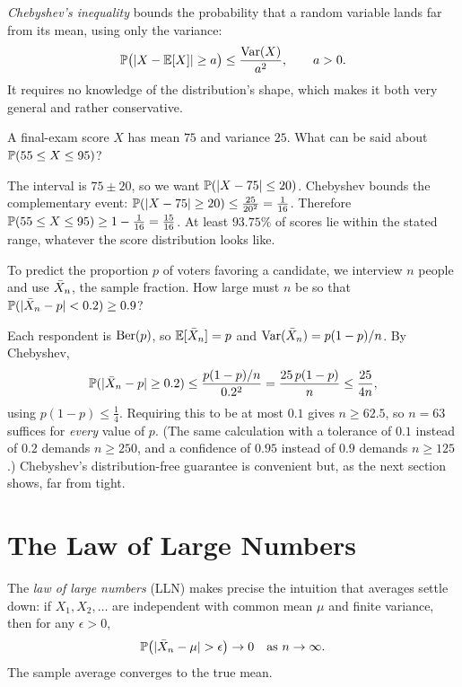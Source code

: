 \emph{Chebyshev's inequality} bounds the probability that a random variable lands
far from its mean, using only the variance:
\[
  \mathbb{P}\bigl(|X-\mathbb{E}[X]|\ge a\bigr)\le\frac{\mathrm{Var}(X)}{a^2},\qquad a>0.
\]
It requires no knowledge of the distribution's shape, which makes it both very
general and rather conservative.

\begin{example}
A final-exam score $X$ has mean $75$ and variance $25$. What can be said about
$\mathbb{P}(55\le X\le 95)$?

\solution The interval is $75\pm 20$, so we want $\mathbb{P}(|X-75|\le 20)$. Chebyshev
bounds the complementary event:
$\mathbb{P}(|X-75|\ge 20)\le \tfrac{25}{20^2}=\tfrac1{16}$. Therefore
$\mathbb{P}(55\le X\le 95)\ge 1-\tfrac1{16}=\tfrac{15}{16}$. At least
$93.75\%$ of scores lie within the stated range, whatever the score
distribution looks like.
\end{example}

\begin{example}
To predict the proportion $p$ of voters favoring a candidate, we interview $n$
people and use $\bar{X}_n$, the sample fraction. How large must $n$ be so that
$\mathbb{P}(|\bar{X}_n-p|<0.2)\ge 0.9$?

\solution Each respondent is $\mathrm{Ber}(p)$, so $\mathbb{E}[\bar{X}_n]=p$ and
$\mathrm{Var}(\bar{X}_n)=p(1-p)/n$. By Chebyshev,
\[
  \mathbb{P}(|\bar{X}_n-p|\ge 0.2)\le \frac{p(1-p)/n}{0.2^2}=\frac{25\,p(1-p)}{n}\le\frac{25}{4n},
\]
using $p(1-p)\le\tfrac14$. Requiring this to be at most $0.1$ gives
$n\ge 62.5$, so $n=63$ suffices for \emph{every} value of $p$. (The same
calculation with a tolerance of $0.1$ instead of $0.2$ demands $n\ge 250$, and a
confidence of $0.95$ instead of $0.9$ demands $n\ge 125$.) Chebyshev's
distribution-free guarantee is convenient but, as the next section shows, far
from tight.
\end{example}

\section{The Law of Large Numbers}

The \emph{law of large numbers} (LLN) makes precise the intuition that averages
settle down: if $X_1,X_2,\dots$ are independent with common mean $\mu$ and finite
variance, then for any $\epsilon>0$,
\[
  \Prob\bigl(|\Xbar_n-\mu|>\epsilon\bigr)\to 0\quad\text{as }n\to\infty.
\]
The sample average converges to the true mean.

